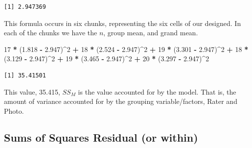 \documentclass[
  11pt,
]{book}
\newenvironment{Shaded}{\begin{snugshade}}{\end{snugshade}}
\newcommand{\DecValTok}[1]{\textcolor[rgb]{0.06,0.06,0.06}{#1}}
\newcommand{\FloatTok}[1]{\textcolor[rgb]{0.06,0.06,0.06}{#1}}
\newcommand{\FunctionTok}[1]{\textcolor[rgb]{0.27,0.27,0.27}{\textbf{#1}}}
\newcommand{\NormalTok}[1]{#1}
\newcommand{\SpecialCharTok}[1]{\textcolor[rgb]{0.43,0.43,0.43}{\textbf{#1}}}
\begin{document}
\begin{Shaded}
\end{Shaded}

\begin{verbatim}
[1] 2.947369
\end{verbatim}

This formula occurs in six chunks, representing the six cells of our designed. In each of the chunks we have the \(n\), group mean, and grand mean.

\begin{Shaded}
\begin{Highlighting}[]
\DecValTok{17} \SpecialCharTok{*}\NormalTok{ (}\FloatTok{1.818} \SpecialCharTok{{-}} \FloatTok{2.947}\NormalTok{)}\SpecialCharTok{\^{}}\DecValTok{2} \SpecialCharTok{+} \DecValTok{18} \SpecialCharTok{*}\NormalTok{ (}\FloatTok{2.524} \SpecialCharTok{{-}} \FloatTok{2.947}\NormalTok{)}\SpecialCharTok{\^{}}\DecValTok{2} \SpecialCharTok{+} \DecValTok{19} \SpecialCharTok{*}\NormalTok{ (}\FloatTok{3.301} \SpecialCharTok{{-}} \FloatTok{2.947}\NormalTok{)}\SpecialCharTok{\^{}}\DecValTok{2} \SpecialCharTok{+}
    \DecValTok{18} \SpecialCharTok{*}\NormalTok{ (}\FloatTok{3.129} \SpecialCharTok{{-}} \FloatTok{2.947}\NormalTok{)}\SpecialCharTok{\^{}}\DecValTok{2} \SpecialCharTok{+} \DecValTok{19} \SpecialCharTok{*}\NormalTok{ (}\FloatTok{3.465} \SpecialCharTok{{-}} \FloatTok{2.947}\NormalTok{)}\SpecialCharTok{\^{}}\DecValTok{2} \SpecialCharTok{+} \DecValTok{20} \SpecialCharTok{*}\NormalTok{ (}\FloatTok{3.297} \SpecialCharTok{{-}} \FloatTok{2.947}\NormalTok{)}\SpecialCharTok{\^{}}\DecValTok{2}
\end{Highlighting}
\end{Shaded}

\begin{verbatim}
[1] 35.41501
\end{verbatim}

This value, 35.415, \(SS_M\) is the value accounted for by the model. That is, the amount of variance accounted for by the grouping variable/factors, Rater and Photo.

\hypertarget{sums-of-squares-residual-or-within-1}{%
\subsection{Sums of Squares Residual (or within)}\label{sums-of-squares-residual-or-within-1}}
\end{document}
